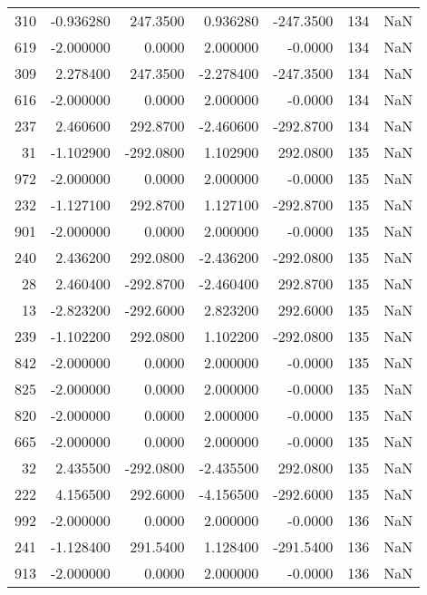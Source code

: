 \begin{tabular}{rrrrrrr}
 310 &   -0.936280 &  247.3500 &    0.936280 &   -247.3500 &         134 & NaN \\
 619 &   -2.000000 &    0.0000 &    2.000000 &     -0.0000 &         134 & NaN \\
 309 &    2.278400 &  247.3500 &   -2.278400 &   -247.3500 &         134 & NaN \\
 616 &   -2.000000 &    0.0000 &    2.000000 &     -0.0000 &         134 & NaN \\
 237 &    2.460600 &  292.8700 &   -2.460600 &   -292.8700 &         134 & NaN \\
  31 &   -1.102900 & -292.0800 &    1.102900 &    292.0800 &         135 & NaN \\
 972 &   -2.000000 &    0.0000 &    2.000000 &     -0.0000 &         135 & NaN \\
 232 &   -1.127100 &  292.8700 &    1.127100 &   -292.8700 &         135 & NaN \\
 901 &   -2.000000 &    0.0000 &    2.000000 &     -0.0000 &         135 & NaN \\
 240 &    2.436200 &  292.0800 &   -2.436200 &   -292.0800 &         135 & NaN \\
  28 &    2.460400 & -292.8700 &   -2.460400 &    292.8700 &         135 & NaN \\
  13 &   -2.823200 & -292.6000 &    2.823200 &    292.6000 &         135 & NaN \\
 239 &   -1.102200 &  292.0800 &    1.102200 &   -292.0800 &         135 & NaN \\
 842 &   -2.000000 &    0.0000 &    2.000000 &     -0.0000 &         135 & NaN \\
 825 &   -2.000000 &    0.0000 &    2.000000 &     -0.0000 &         135 & NaN \\
 820 &   -2.000000 &    0.0000 &    2.000000 &     -0.0000 &         135 & NaN \\
 665 &   -2.000000 &    0.0000 &    2.000000 &     -0.0000 &         135 & NaN \\
  32 &    2.435500 & -292.0800 &   -2.435500 &    292.0800 &         135 & NaN \\
 222 &    4.156500 &  292.6000 &   -4.156500 &   -292.6000 &         135 & NaN \\
 992 &   -2.000000 &    0.0000 &    2.000000 &     -0.0000 &         136 & NaN \\
 241 &   -1.128400 &  291.5400 &    1.128400 &   -291.5400 &         136 & NaN \\
 913 &   -2.000000 &    0.0000 &    2.000000 &     -0.0000 &         136 & NaN \\

\end{tabular}
